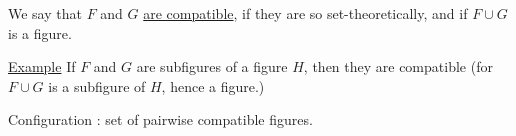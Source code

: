 We say that $F$ and $G$ \uline{are compatible},  if they are so set-theoretically, and if $F\cup G$ is a figure. 

\uline{Example} If $F$ and $G$ are subfigures of a figure $H$, then they are compatible (for  $F\cup G$ is a subfigure of $H$, hence a figure.)

Configuration : set of pairwise compatible figures.
